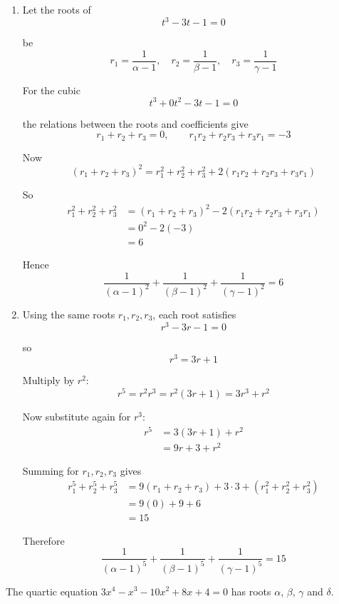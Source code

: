 \documentclass[leqno]{article}
\begin{document}
\begin{enumerate}[
  label=\textbf{\arabic*.},
  leftmargin=*,
  topsep=0pt,
  partopsep=0pt,
  parsep=0pt
]
\begin{djsSolution}
\begin{enumerate}[label=\textbf{(\alph*)}]
So the cubic equation whose roots are
\[
\frac{1}{\alpha-1},\quad \frac{1}{\beta-1},\quad \frac{1}{\gamma-1}
\]

is
\[
t^3-3t-1=0
\]

  \item Let the roots of
\[
t^3-3t-1=0
\]

be
\[
r_1=\frac{1}{\alpha-1},\quad r_2=\frac{1}{\beta-1},\quad r_3=\frac{1}{\gamma-1}
\]

For the cubic
\[
t^3+0t^2-3t-1=0
\]

the relations between the roots and coefficients give
\[
r_1+r_2+r_3=0,\qquad r_1r_2+r_2r_3+r_3r_1=-3
\]

Now
\[
(r_1+r_2+r_3)^2=r_1^2+r_2^2+r_3^2+2(r_1r_2+r_2r_3+r_3r_1)
\]

So
\begin{align*}
r_1^2+r_2^2+r_3^2
&=(r_1+r_2+r_3)^2-2(r_1r_2+r_2r_3+r_3r_1)\\
&=0^2-2(-3)\\
&=6
\end{align*}

Hence
\[
\frac{1}{(\alpha-1)^2}+\frac{1}{(\beta-1)^2}+\frac{1}{(\gamma-1)^2}=6
\]

  \item Using the same roots $r_1,r_2,r_3$, each root satisfies
\[
r^3-3r-1=0
\]

so
\[
r^3=3r+1
\]

Multiply by $r^2$:
\[
r^5=r^2r^3=r^2(3r+1)=3r^3+r^2
\]

Now substitute again for $r^3$:
\begin{align*}
r^5&=3(3r+1)+r^2\\
&=9r+3+r^2
\end{align*}

Summing for $r_1,r_2,r_3$ gives
\begin{align*}
r_1^5+r_2^5+r_3^5
&=9(r_1+r_2+r_3)+3\cdot 3+(r_1^2+r_2^2+r_3^2)\\
&=9(0)+9+6\\
&=15
\end{align*}

Therefore
\[
\frac{1}{(\alpha-1)^5}+\frac{1}{(\beta-1)^5}+\frac{1}{(\gamma-1)^5}=15
\]
\end{enumerate}
\end{djsSolution}


\newpage

\questionitem

The quartic equation $3x^4 - x^3 - 10x^2 + 8x + 4 = 0$ has roots $\alpha$, $\beta$, $\gamma$ and $\delta$. \\


\end{enumerate}
\end{document}
